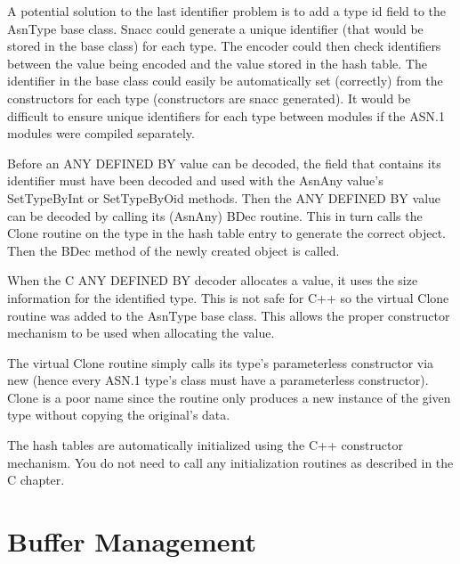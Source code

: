 A potential solution to the last identifier problem is to add a type
id field to the {\C AsnType} base class.  Snacc could generate a
unique identifier (that would be stored in the base class) for each
type.  The encoder could then check identifiers between the value
being encoded and the value stored in the hash table.  The identifier
in the base class could easily be automatically set (correctly) from
the constructors for each type (constructors are snacc generated).  It
would be difficult to ensure unique identifiers for each type between
modules if the ASN.1 modules were compiled separately.

Before an ANY DEFINED BY value can be decoded, the field that contains
its identifier must have been decoded and used with the {\C AsnAny}
value's {\C SetTypeByInt} or {\C SetTypeByOid} methods.  Then the
ANY DEFINED BY value can be decoded by calling its ({\C AsnAny})
{\C BDec} routine.  This in turn calls the {\C Clone} routine on
the type in the hash table entry to generate the correct object.  Then
the {\C BDec} method of the newly created object is called.

When the C ANY DEFINED BY decoder allocates a value, it uses the size
information for the identified type.  This is not safe for C++ so the
virtual {\C Clone} routine was added to the {\C AsnType} base
class.  This allows the proper constructor mechanism to be used when
allocating the value.

The virtual {\C Clone} routine simply calls its type's parameterless
constructor via {\C new} (hence every ASN.1 type's class must have a
parameterless constructor).  {\C Clone} is a poor name since
the routine only produces a new instance of the given type without
copying the original's data.

The hash tables are automatically initialized using the C++ constructor
mechanism.  You do not need to call any initialization routines as
described in the C chapter.


\section{\label{buffer-C++-section}Buffer Management}

